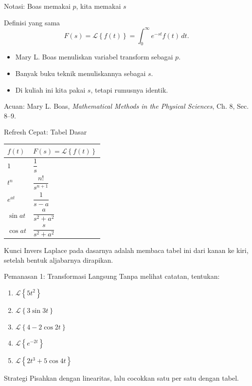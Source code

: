 \documentclass[aspectratio=169,10pt]{beamer}
\newcommand{\Lcal}{\mathcal{L}}
\newcommand{\Lap}[1]{\Lcal\left\{#1\right\}}
\newcommand{\boasnote}{\scriptsize\color{iteraGray}Acuan: Mary L. Boas, \textit{Mathematical Methods in the Physical Sciences}, Ch. 8, Sec. 8--9.}
\begin{document}
\begin{frame}{Notasi: Boas memakai $p$, kita memakai $s$}
\begin{block}{Definisi yang sama}
\[
F(s)=\Lap{f(t)}=\int_0^\infty e^{-st}f(t)\,dt.
\]
\end{block}
\begin{itemize}
\item Mary L. Boas menuliskan variabel transform sebagai $p$.
\item Banyak buku teknik menuliskannya sebagai $s$.
\item Di kuliah ini kita pakai $s$, tetapi rumusnya identik.
\end{itemize}
\vfill
\boasnote
\end{frame}

\begin{frame}{Refresh Cepat: Tabel Dasar}
\small
\begin{center}
\begin{tabular}{>{\centering\arraybackslash}m{} >{\centering\arraybackslash}m{}}
\toprule
$f(t)$ & $F(s)=\Lap{f(t)}$\\
\midrule
$1$ & $\dfrac{1}{s}$\\[2mm]
$t^n$ & $\dfrac{n!}{s^{n+1}}$\\[2mm]
$e^{at}$ & $\dfrac{1}{s-a}$\\[2mm]
$\sin at$ & $\dfrac{a}{s^2+a^2}$\\[2mm]
$\cos at$ & $\dfrac{s}{s^2+a^2}$\\
\bottomrule
\end{tabular}
\end{center}
\begin{alertblock}{Kunci}
Invers Laplace pada dasarnya adalah membaca tabel ini dari kanan ke kiri, setelah bentuk aljabarnya dirapikan.
\end{alertblock}
\end{frame}

\begin{frame}{Pemanasan 1: Transformasi Langsung}
Tanpa melihat catatan, tentukan:
\begin{enumerate}
\item $\Lap{5t^2}$
\item $\Lap{3\sin 3t}$
\item $\Lap{4-2\cos 2t}$
\item $\Lap{e^{-2t}}$
\item $\Lap{2t^3+5\cos 4t}$
\end{enumerate}
\vspace{2mm}
\begin{exampleblock}{Strategi}
Pisahkan dengan linearitas, lalu cocokkan satu per satu dengan tabel.
\end{exampleblock}
\end{frame}
\end{document}
